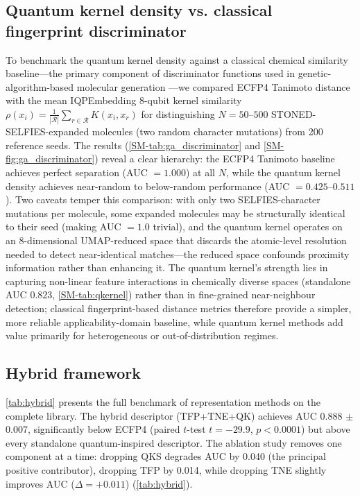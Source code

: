 \documentclass[11pt,a4paper]{article}
\begin{document}
\subsection{Quantum kernel density vs. classical fingerprint discriminator}

To benchmark the quantum kernel density against a classical chemical similarity baseline---the primary component of discriminator functions used in genetic-algorithm-based molecular generation \citep{jensen2019augmenting}---we compared ECFP4 Tanimoto distance with the mean IQPEmbedding 8-qubit kernel similarity $\rho(x_i) = \frac{1}{|\mathcal{R}|}\sum_{r \in \mathcal{R}} K(x_i, x_r)$ for distinguishing $N = 50$--$500$ STONED-SELFIES-expanded molecules (two random character mutations) from \num{200} reference seeds. The results (\cref{SM-tab:ga_discriminator} and \cref{SM-fig:ga_discriminator}) reveal a clear hierarchy: the ECFP4 Tanimoto baseline achieves perfect separation (AUC $= \num{1.000}$) at all $N$, while the quantum kernel density achieves near-random to below-random performance (AUC $= \numrange{0.425}{0.511}$). Two caveats temper this comparison: with only two SELFIES-character mutations per molecule, some expanded molecules may be structurally identical to their seed (making AUC $= \num{1.0}$ trivial), and the quantum kernel operates on an 8-dimensional UMAP-reduced space that discards the atomic-level resolution needed to detect near-identical matches---the reduced space confounds proximity information rather than enhancing it. The quantum kernel's strength lies in capturing non-linear feature interactions in chemically diverse spaces (standalone AUC \num{0.823}, \cref{SM-tab:qkernel}) rather than in fine-grained near-neighbour detection; classical fingerprint-based distance metrics therefore provide a simpler, more reliable applicability-domain baseline, while quantum kernel methods add value primarily for heterogeneous or out-of-distribution regimes.

\subsection{Hybrid framework}

\cref{tab:hybrid} presents the full benchmark of representation methods on the complete library. The hybrid descriptor (TFP+TNE+QK) achieves AUC \num{0.888} $\pm$ \num{0.007}, significantly below ECFP4 (paired $t$-test $t = -\num{29.9}$, $p < \num{0.0001}$) but above every standalone quantum-inspired descriptor. The ablation study removes one component at a time: dropping QKS degrades AUC by \num{0.040} (the principal positive contributor), dropping TFP by \num{0.014}, while dropping TNE slightly improves AUC ($\Delta = +\num{0.011}$) (\cref{tab:hybrid}).
\end{document}
